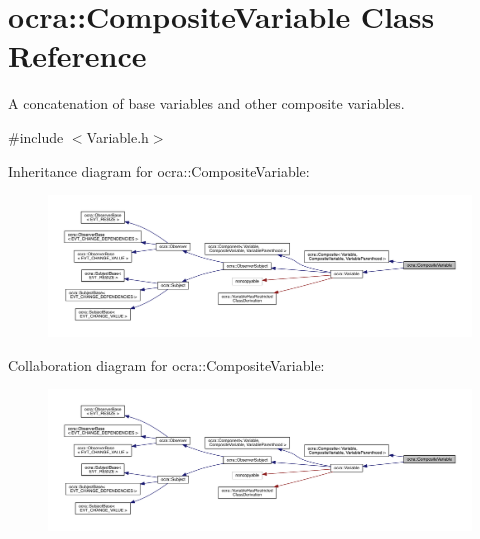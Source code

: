 \hypertarget{classocra_1_1CompositeVariable}{}\section{ocra\+:\+:Composite\+Variable Class Reference}
\label{classocra_1_1CompositeVariable}


A concatenation of base variables and other composite variables.  




{\ttfamily \#include $<$Variable.\+h$>$}



Inheritance diagram for ocra\+:\+:Composite\+Variable\+:\nopagebreak
\begin{figure}[H]
\begin{center}
\leavevmode
\includegraphics[width=350pt]{d7/d95/classocra_1_1CompositeVariable__inherit__graph}
\end{center}
\end{figure}


Collaboration diagram for ocra\+:\+:Composite\+Variable\+:\nopagebreak
\begin{figure}[H]
\begin{center}
\leavevmode
\includegraphics[width=350pt]{db/da1/classocra_1_1CompositeVariable__coll__graph}
\end{center}
\end{figure}
